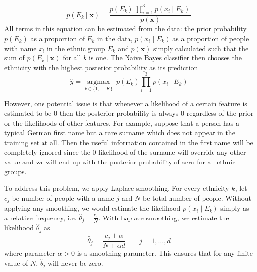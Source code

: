 \begin{equation}
p(E_k \mid \mathbf{x}) = \frac{p(E_k) \  \prod_{i=1}^3 p(x_i \mid E_k)\,}{p(\mathbf{x})}
\end{equation}
 All terms in this equation can be estimated from the data: the prior probability $p(E_k)$ as a proportion of $E_k$ in the data, $p(x_i \mid E_k)$ as a proportion of people with name $x_i$ in the ethnic group $E_k$ and $p(\mathbf{x})$ simply calculated such that the sum of $p(E_k \mid \mathbf{x})$ for all $k$ is one. 
The Naive Bayes classifier then chooses the ethnicity with the highest posterior probability as its prediction
\begin{equation}
    \hat{y} = \underset{k \in \{1, \dots, K\}}{\operatorname{argmax}} \ p(E_k) \displaystyle\prod_{i=1}^{3} p(x_i \mid E_k)
\end{equation}

However, one potential issue is that whenever a likelihood of a certain feature is estimated to be 0 then the posterior probability is always 0 regardless of the prior  or the likelihoods of other features. For example, suppose that a person has a typical German first name but a rare surname which does not appear in the training set at all. 
Then the useful information contained in the first name will be completely ignored since the 0 likelihood of the surname will override any other value and we will end up with the posterior probability of zero for all ethnic groups.

To address this problem, we apply Laplace smoothing. 
For every ethnicity $k$, let $c_j$ be number of people with a name $j$ and $N$ be total number of people.  Without applying any smoothing, we would estimate the likelihood  $p(x_i \mid E_k)$ simply as a relative frequency, i.e. $\hat\theta_j = \frac{c_j}{N}$. With  Laplace smoothing, we estimate  the  likelihood $\hat\theta_j$ as 
\begin{equation}
    \hat\theta_j = \frac{c_j + \alpha}{N + \alpha d} \qquad j = 1, \dots, d
\end{equation}
where parameter $\alpha > 0 $ is a smoothing parameter.  This ensures that for any finite value of $N$,  $\hat\theta_j$ will never be zero. %




